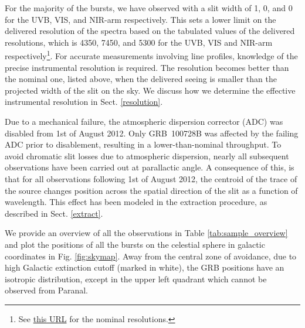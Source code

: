 \documentclass{aa}    %
\begin{document}
For the majority of the bursts, we have observed with a slit width of 1,
0, and 0 for the UVB, VIS, and NIR-arm respectively. This sets a
lower limit on the delivered resolution of the spectra based on the tabulated
values of the delivered resolutions, which is 4350, 7450, and 5300 for the UVB,
VIS and NIR-arm
respectively\footnote{See \href{https://www.eso.org/sci/facilities/paranal/instruments/xshooter/inst.html}{this URL} for the nominal resolutions.}. %
For accurate measurements involving line profiles, knowledge of the precise
instrumental resolution is required. The resolution becomes better than the
nominal one, listed above, when the delivered seeing is smaller than the
projected width of the slit on the sky. We discuss how we determine the
effective instrumental resolution in Sect. \ref{resolution}.

Due to a mechanical failure, the atmospheric dispersion corrector (ADC) was
disabled from 1st of August 2012. Only GRB~100728B was affected by the failing
ADC prior to disablement, resulting in a lower-than-nominal throughput. To avoid
chromatic slit losses due to atmospheric dispersion, nearly all subsequent
observations have been carried out at parallactic angle. A consequence of this,
is that for all observations following 1st of August 2012, the centroid of the
trace of the source changes position across the spatial direction of the slit as
a function of wavelength. This effect has been modeled in the extraction
procedure, as described in Sect. \ref{extract}.



We provide an overview of all the observations in Table
\ref{tab:sample_overview} and plot the positions of all the bursts on the
celestial sphere in galactic coordinates in Fig. \ref{fig:skymap}. Away from the
central zone of avoidance, due to high Galactic extinction cutoff (marked in
white), the GRB positions have an isotropic distribution, except in the upper
left quadrant which cannot be observed from Paranal.
\end{document}
